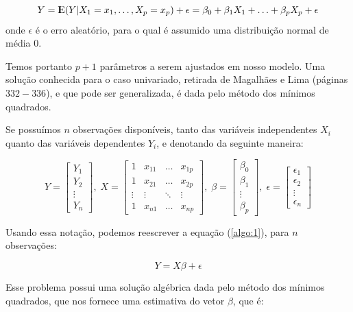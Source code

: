 \begin{equation}\label{algo:1}
Y = {\rm I\kern-.3em E}(Y|X_1 = x_1, \ldots, X_p = x_p) + \epsilon = \beta_0 + \beta_1 X_1 + \ldots + \beta_p X_p + \epsilon
\end{equation}
onde $\epsilon$ é o erro aleatório, para o qual é assumido uma distribuição normal de média $0$.

Temos portanto $p{+}1$ parâmetros a serem ajustados em nosso modelo. Uma solução conhecida para o caso univariado, retirada de Magalhães e Lima \citep{antonio} (páginas $332{-}336$), e que pode ser generalizada, é dada pelo método dos mínimos quadrados. 

Se possuímos $n$ observações disponíveis, tanto das variáveis independentes $X_i$ quanto das variáveis dependentes $Y_i$, e denotando da seguinte maneira:

\[
Y = \left[ \begin{array}{c} Y_1 \\ Y_2 \\ \vdots \\ Y_n \end{array} \right], \;
X = \left[ \begin{array}{cccc} 1 & x_{11} & \ldots & x_{1p} \\ 1 & x_{21} & \ldots & x_{2p} \\ \vdots & \vdots & \ddots & \vdots \\ 1 & x_{n1} & \ldots & x_{np} \end{array} \right], \;
\beta = \left[ \begin{array}{c} \beta_0 \\ \beta_1 \\ \vdots \\ \beta_p \end{array} \right], \;
\epsilon = \left[ \begin{array}{c} \epsilon_1 \\ \epsilon_2 \\ \vdots \\ \epsilon_n \end{array} \right]
\]

Usando essa notação, podemos reescrever a equação (\ref{algo:1}), para $n$ observações:

\begin{equation}\label{algo:2}
Y = X \beta + \epsilon
\end{equation}

Esse problema possui uma solução algébrica dada pelo método dos mínimos quadrados, que nos fornece uma estimativa do vetor $\beta$, que é:

